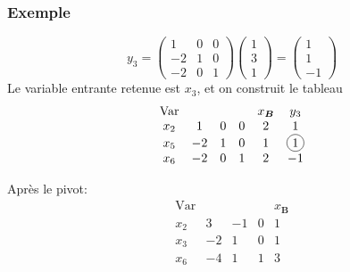 \documentclass[usepdftitle=false]{beamer}
\newcommand*\circled[1]{\tikz[baseline=(char.base)]{
    \node[shape=circle,draw,inner sep=2pt] (char) {#1};}}
\def\bB{\boldsymbol{B}}
\begin{document}
\begin{frame}
\frametitle{Exemple}

\[
y_3 =
\begin{pmatrix}
1 & 0 & 0 \\
-2 & 1 & 0 \\
-2 & 0 & 1
\end{pmatrix}
\begin{pmatrix}
1 \\
3 \\
1
\end{pmatrix}
=
\begin{pmatrix}
1 \\
1 \\
-1
\end{pmatrix}
\]
Le variable entrante retenue est $x_3$, et on construit le tableau
\[
\begin{matrix}
\mbox{Var} & & & & x_{\bB} & y_3 \\
x_2 & 1 & 0 & 0 & 2 & 1 \\
x_5 & -2 & 1 & 0 & 1 & \circled{1} \\
x_6 & -2 & 0 & 1 & 2 & -1
\end{matrix}
\]

\mbox{}

Après le pivot:
\[
\begin{matrix}
\mbox{Var} & & & & x_{\bB} \\
x_2 & 3 & -1 & 0 & 1 \\
x_3 & -2 & 1 & 0 & 1 \\
x_6 & -4 & 1 & 1 & 3
\end{matrix}
\]

\end{frame}
\end{document}
